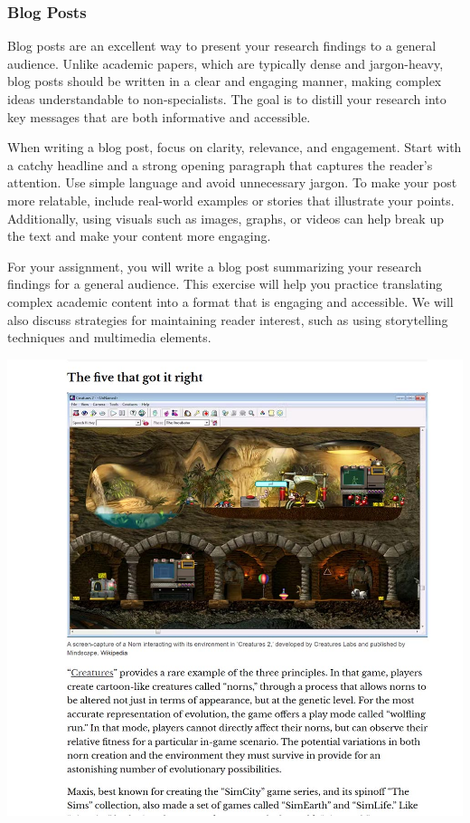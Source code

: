 \documentclass[
]{book}
\begin{document}
\subsubsection{Blog Posts}\label{blog-posts}

Blog posts are an excellent way to present your research findings to a general audience. Unlike academic papers, which are typically dense and jargon-heavy, blog posts should be written in a clear and engaging manner, making complex ideas understandable to non-specialists. The goal is to distill your research into key messages that are both informative and accessible.

When writing a blog post, focus on clarity, relevance, and engagement. Start with a catchy headline and a strong opening paragraph that captures the reader's attention. Use simple language and avoid unnecessary jargon. To make your post more relatable, include real-world examples or stories that illustrate your points. Additionally, using visuals such as images, graphs, or videos can help break up the text and make your content more engaging.

For your assignment, you will write a blog post summarizing your research findings for a general audience. This exercise will help you practice translating complex academic content into a format that is engaging and accessible. We will also discuss strategies for maintaining reader interest, such as using storytelling techniques and multimedia elements.

\includegraphics[width=1\textwidth,height=\textheight]{images/fig091.jpg}
\end{document}
